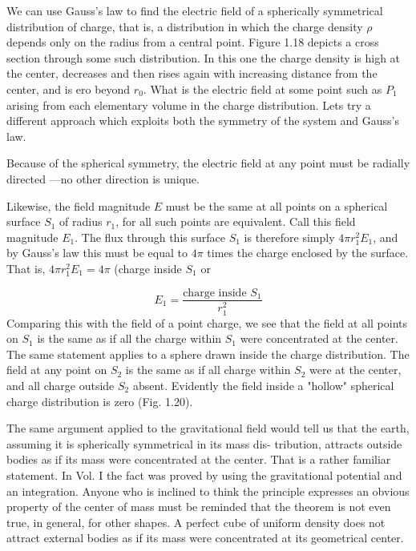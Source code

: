 We can use Gauss's law to find the electric field of a spherically
symmetrical distribution of charge, that is, a distribution in which
the charge density $\rho$ depends only on the radius from a central
point. Figure 1.18 depicts a cross section through some such
distribution. In this one the charge density is high at the center,
decreases and then rises again with increasing distance from the
center, and is ero beyond $r_0$. What is the electric field at some
point such as $P_1$ arising from each elementary volume in the charge
distribution. Lets try a different approach which exploits both the
symmetry of the system and Gauss's law.

Because of the spherical symmetry, the electric field at any point
must be radially directed ---no other direction is unique.

Likewise, the field magnitude $E$ must be the same at all points on a
spherical surface $S_1$ of radius $r_1$, for all such points are
equivalent. Call this field magnitude $E_1$. The flux through this
surface $S_1$ is therefore simply $4 \pi r_1^2E_1$, and by Gauss's
law this must be equal to $4\pi$ times the charge enclosed by the
surface. That is, $4 \pi r_1^2E_1 =  4\pi$ (charge inside $S_1$ or

\begin{equation} 
  E_1 =  \frac{\text{charge inside $S_1$}}{r_1^2}
\end{equation}
Comparing this with the field of a point charge, we see that the
field at all points on $S_1$ is the same as if all the charge within $S_1$ were
concentrated at the center. The same statement applies to a sphere
drawn inside the charge distribution. The field at any point on $S_2$
is the same as if all charge within $S_2$ were at the center, and all charge
outside $S_2$ absent. Evidently the field inside a "hollow" spherical
charge distribution is zero (Fig. 1.20).

The same argument applied to the gravitational field would tell us
that the earth, assuming it is spherically symmetrical in its mass dis-
tribution, attracts outside bodies as if its mass were concentrated at
the center. That is a rather familiar statement. In Vol. I the fact
was proved by using the gravitational potential and an integration.
Anyone who is inclined to think the principle expresses an obvious
property of the center of mass must be reminded that the theorem
is not even true, in general, for other shapes. A perfect cube of uniform
density does not attract external bodies as if its mass were
concentrated at its geometrical center.

